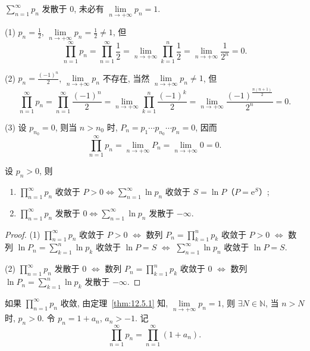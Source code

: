 \begin{example}\label{ex:12.5.1}
$\sum_{n=1}^{\infty}p_{n}$ 发散于 $0$, 未必有 $\lim\limits_{n\to+\infty}p_{n}=1$.
\end{example}

(1) $p_{n}=\frac{1}{2}$, $\lim\limits_{n\to+\infty}p_{n}=\frac{1}{2}\neq1$, 但
\[
  \prod_{n=1}^{\infty}p_{n}=\prod_{n=1}^{\infty}\frac{1}{2}=\lim_{n\to+\infty}\prod_{k=1}^{n}\frac{1}{2}=\lim_{n\to+\infty}\frac{1}{2^{n}}=0.
\]

(2) $p_{n}=\frac{(-1)^{n}}{2}$, $\lim\limits_{n\to+\infty}p_{n}$ 不存在, 当然 $\lim\limits_{n\to+\infty}p_{n}\neq1$, 但
\[
  \prod_{n=1}^{\infty}p_{n}=\prod_{n=1}^{\infty}\frac{(-1)^{n}}{2}=\lim_{n\to+\infty}\prod_{k=1}^{n}\frac{(-1)^{k}}{2}=\lim_{n\to+\infty}\frac{(-1)^{\frac{n(n+1)}{2}}}{2^{n}}=0.
\]

(3) 设 $p_{n_{0}}=0$, 则当 $n>n_{0}$ 时, $P_{n}=p_{1}\cdots p_{n_{0}}\cdots p_{n}=0$, 因而
\[
  \prod_{n=1}^{\infty}p_{n}=\lim_{n\to+\infty}P_{n}=\lim_{n\to+\infty}0=0.
\]

\begin{theorem}[无穷乘积与无穷级数敛散性的对偶定理]\label{thm:12.5.2}
设 $p_{n}>0$, 则
\begin{enumerate}
  \item $\prod_{n=1}^{\infty}p_{n}$ 收敛于 $P>0 \Leftrightarrow \sum_{n=1}^{\infty}\ln p_{n}$ 收敛于 $S=\ln P$（$P=\mathrm{e}^{S}$）;
  \item $\prod_{n=1}^{\infty}p_{n}$ 发散于 $0 \Leftrightarrow \sum_{n=1}^{\infty}\ln p_{n}$ 发散于 $-\infty$.
\end{enumerate}
\end{theorem}

\begin{proof}
(1) $\prod_{n=1}^{\infty}p_{n}$ 收敛于 $P>0$
$\Leftrightarrow$ 数列 $P_{n}=\prod_{k=1}^{n}p_{k}$ 收敛于 $P>0$
$\Leftrightarrow$ 数列 $\ln P_{n}=\sum_{k=1}^{n}\ln p_{k}$ 收敛于 $\ln P=S$
$\Leftrightarrow$ $\sum_{n=1}^{\infty}\ln p_{n}$ 收敛于 $\ln P=S$.

(2) $\prod_{n=1}^{\infty}p_{n}$ 发散于 $0$
$\Leftrightarrow$ 数列 $P_{n}=\prod_{k=1}^{n}p_{k}$ 收敛于 $0$
$\Leftrightarrow$ 数列 $\ln P_{n}=\sum_{k=1}^{n}\ln p_{k}$ 发散于 $-\infty$.
\end{proof}

如果 $\prod_{n=1}^{\infty}p_{n}$ 收敛, 由定理~\ref{thm:12.5.1} 知, $\lim\limits_{n\to+\infty}p_{n}=1$, 则 $\exists N\in\mathbb{N}$, 当 $n>N$ 时, $p_{n}>0$. 令 $p_{n}=1+a_{n}$, $a_{n}>-1$. 记
\[
  \prod_{n=1}^{\infty}p_{n}=\prod_{n=1}^{\infty}(1+a_{n}).
\]

